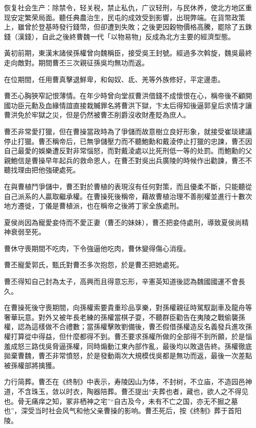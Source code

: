 恢复社会生产：除禁令，轻关税，禁止私仇，广议轻刑，与民休养，使北方地区重现安定繁荣局面。聽任典農治生，民屯的成效受到影響，出現弊端。在貨幣政策上，雖曾於登基時發行錢幣，但卻遭到失敗；之後更因穀物價格高騰，罷除了五銖錢（漢錢），自此之後終曹魏一代「以物易物」反成為北方主要的經濟型態。

黃初前期，東漢末諸侯孫權曾向魏稱臣，接受吳王封號。經過多次斡旋，魏吳最終走向敵對。期間曹丕三次親征孫吳均無功而返。

在位期間，任用曹真擊退鮮卑，和匈奴、氐、羌等外族修好，平定邊患。

曹丕心胸狹窄記恨薄情。在年少時曾向堂叔曹洪借錢不成懷恨在心，稱帝後不顧開國功臣元勳及血緣情誼直接栽贓罪名將曹洪下獄，卞太后得知後逼郭皇后求情才讓曹洪免於牢獄之災，但是仍然被曹丕削爵沒收財產貶為庶人。

曹丕非常愛打獵，但在曹操當政時為了爭儲而故意樹立良好形象，就接受崔琰建議停止打獵。曹丕稱帝后，已無爭儲壓力而不聽鮑勳和戴淩停止打獵的忠諫，曹丕因自己最愛的娛樂遭反對非常惱怒，而對戴淩處以比死刑低一等的处罰。而鮑勳的父親鮑信是曹操早年起兵的救命恩人，在曹丕對吳出兵廣陵的時候作出勸諫，曹丕不聽找理由把他強硬處死。

在與曹植鬥爭儲中，曹丕對於曹植的表現沒有任何對策，而且優柔不斷，只能聽從自己派系的人贏取繼承權。在曹操死後稱帝，藉故曹植治理不善削權並進行十數次地方遷徙，丁儀是曹植派，也在稱帝之後將丁家全族處刑。

夏侯尚因為寵愛妾侍而不愛正妻（曹丕的妹妹），曹丕把妾侍處刑，導致夏侯尚精神衰弱至死。

曹休守喪期間不吃肉，下令強逼他吃肉，曹休變得傷心消瘦。

曹丕寵愛郭氏，甄氏對曹丕多次抱怨，於是曹丕把她處死。

曹丕得知自己封為太子，高興而且得意忘形，辛憲英知道後認為魏國國運不會長久。

在曹操死後守喪期間，向孫權索要貴重珍品享樂，對孫權親征時駕馭副車及龍舟等奢華玩意。對外又被年長老練的孫權當棋子耍，不聽群臣勸告在夷陵之戰偷襲孫權，認為這樣做不合禮數；當孫權擊敗劉備後，曹丕假借孫權造反名義發兵進攻孫權打算從中得益，但什麼都得不到。曹丕要求孫權所做的全部得不到所願，於是惱羞成怒三路伐吳脅逼孫權，同時煽動江東內部作亂，最後均以敗退告終。孫權徹底拋棄曹魏，曹丕非常憤怒，於是發動兩次大規模伐吳都是無功而返，最後一次差點被孫權部將擒獲。

力行简葬。曹丕在《终制》中表示，寿陵因山为体，不封树，不立庙，不造园邑神道，不含珠玉，敛以时衣，陶器陪葬。曹丕提出“夫葬也者，藏也，欲人之不得见也。骨无痛痒之知，冢非栖神之宅”“自古及今，未有不亡之国，亦无不掘之墓也”，深受当时社会风气和他父亲曹操的影响。曹丕死后，按《终制》葬于首阳陵。

